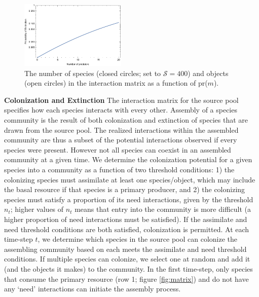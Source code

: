 \documentclass[twocolumn,preprintnumbers,amsmath,amssymb,superscriptaddress]{revtex4}
\begin{document}
\begin{figure}
\centering
\includegraphics[width=0.45\textwidth]{extinction.pdf}
\caption{
The number of species (closed circles; set to $\mathcal S=400$) and objects (open circles) in the interaction matrix as a function of pr($m$).
}
\label{fig:ext}
\end{figure} 

\textbf{Colonization and Extinction} The interaction matrix for the source pool specifies how each species interacts with every other.
Assembly of a species community is the result of both colonization and extinction of species that are drawn from the source pool.
The realized interactions within the assembled community are thus a subset of the potential interactions observed if every species were present.
However not all species can coexist in an assembled community at a given time.
We determine the colonization potential for a given species into a community as a function of two threshold conditions:
1) the colonizing species must assimilate at least one species/object, which may include the basal resource if that species is a primary producer, and
2) the colonizing species must satisfy a proportion of its need interactions, given by the threshold $n_t$; higher values of $n_t$ means that entry into the community is more difficult (a higher proportion of need interactions must be satisfied).
If the assimilate and need threshold conditions are both satisfied, colonization is permitted.
At each time-step $t$, we determine which species in the source pool can colonize the assembling community based on each meets the assimilate and need threshold conditions.
If multiple species can colonize, we select one at random and add it (and the objects it makes) to the community.
In the first time-step, only species that consume the primary resource (row 1; figure \ref{fig:matrix}) and do not have any `need' interactions can initiate the assembly process.
\end{document}

